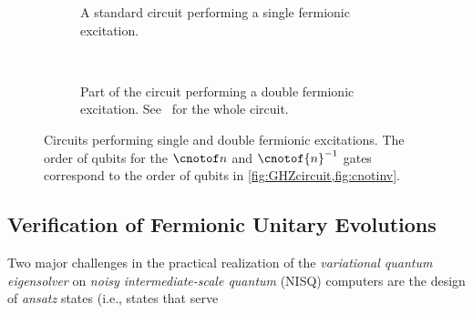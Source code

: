 \newcommand{\figFermionic}[0]{
\begin{figure}[t]
\begin{subfigure}[b]{\linewidth}
\resizebox{\linewidth}{!}{

}
\caption{A standard circuit performing a single fermionic excitation.}
\label{fig:1fermionic}
\end{subfigure}\\[3mm]

\begin{subfigure}[b]{\linewidth}
\resizebox{\linewidth}{!}{

}
\caption{Part of the circuit performing a double fermionic excitation.
  See~\cite[Fig.~11]{YordanovADB20} for the whole circuit.}
\label{fig:2fermionic}
\end{subfigure}
\vspace{-5mm}
\caption{Circuits performing single and double fermionic excitations.  The order of qubits for the $\cnotof n$ and $\cnotof{n}^{-1}$ gates correspond to the order of qubits in \cref{fig:GHZcircuit,fig:cnotinv}.}
\end{figure}
}

\figFermionic   %

\vspace{-0.0mm}
\subsection{Verification of Fermionic Unitary Evolutions}\label{sec:fermionic}
\vspace{-0.0mm}
%
Two major challenges in the practical realization of the \emph{variational
quantum eigensolver} on \emph{noisy intermediate-scale quantum} (NISQ)
computers are the design of \emph{ansatz} states (i.e., states that serve
\linebreak


